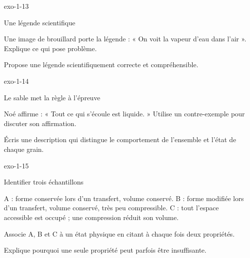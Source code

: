 \documentclass[12pt,twoside,openany]{book}
\begin{document}
\begin{blocLivre}{exo-1-13}
\begin{exercice}[3]{Une légende scientifique}
\begin{questions}
\item Une image de brouillard porte la légende : « On voit la vapeur d’eau dans l’air ». Explique ce qui pose problème.
\item Propose une légende scientifiquement correcte et compréhensible.
\end{questions}
\end{exercice}\end{blocLivre}
\begin{blocLivre}{exo-1-14}
\begin{exercice}[3]{Le sable met la règle à l’épreuve}
\begin{questions}
\item Noé affirme : « Tout ce qui s’écoule est liquide. » Utilise un contre-exemple pour discuter son affirmation.
\item Écris une description qui distingue le comportement de l’ensemble et l’état de chaque grain.
\end{questions}
\end{exercice}\end{blocLivre}
\begin{blocLivre}{exo-1-15}
\begin{exercice}[3]{Identifier trois échantillons}
\begin{donnees}A : forme conservée lors d’un transfert, volume conservé. B : forme modifiée lors d’un transfert, volume conservé, très peu compressible. C : tout l’espace accessible est occupé ; une compression réduit son volume.\par
\end{donnees}
\begin{questions}
\item Associe A, B et C à un état physique en citant à chaque fois deux propriétés.
\item Explique pourquoi une seule propriété peut parfois être insuffisante.
\end{questions}
\end{exercice}\end{blocLivre}
\label{defi-ex-1}
\end{document}

